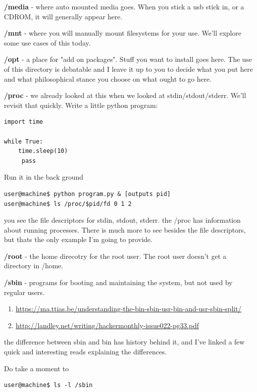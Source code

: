 \documentclass[10pt]{article}
\begin{document}
{\color{red} \textbf{/media}} - where auto mounted media goes. When you stick a
usb stick in, or a CDROM, it will generally appear here.

{\color{red} \textbf{/mnt}} - where you will manually mount filesystems for your
use. We'll explore some use cases of this today.

{\color{red} \textbf{/opt}} - a place for "add on packages". Stuff you want to
install goes here. The use of this directory is debatable and I leave it up to
you to decide what you put here and what philosophical stance you choose on what
ought to go here.

{\color{red} \textbf{/proc}} - we already looked at this when we looked at
stdin/stdout/stderr. We'll revisit that quickly. Write a little python program:

\begin{lstlisting}
import time

while True: 
	time.sleep(10)
	 pass 
\end{lstlisting}

Run it in the back ground

\begin{lstlisting}
user@machine$ python program.py & [outputs pid] 
user@machine$ ls /proc/$pid/fd 0 1 2 
\end{lstlisting}

you see the file descriptors for stdin, stdout, stderr. the /proc has
information about running processes. There is much more to see besides the file
descriptors, but thats the only example I'm going to provide.

{\color{red} \textbf{/root}} - the home direcotry for the root user. The root
user doesn't get a directory in /home.

{\color{red} \textbf{/sbin}} - programs for booting and maintaining the system,
but not used by regular users. 

\begin{enumerate}
\item \url{https://ma.ttias.be/understanding-the-bin-sbin-usr-bin-and-usr-sbin-split/}
\item \url{http://landley.net/writing/hackermonthly-issue022-pg33.pdf}
\end{enumerate}

the difference between sbin and bin has history behind it, and I've linked a few
quick and interesting reads explaining the differences.

Do take a moment to 

\begin{lstlisting}
user@machine$ ls -l /sbin 
\end{lstlisting}
\end{document}
